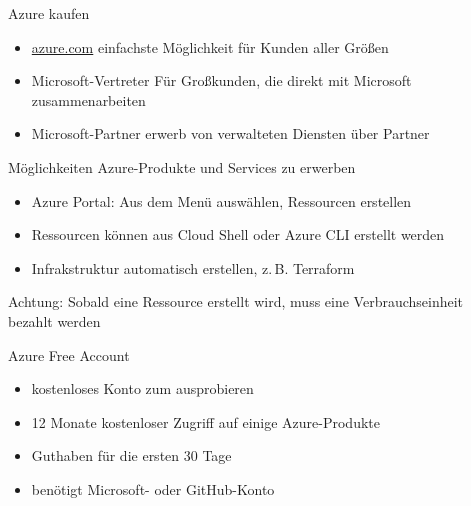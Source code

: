 
\begin{flashcard}[\ ]{Azure kaufen}
    \begin{itemize}
        \item \href{azure.com}{azure.com}\newline
        einfachste Möglichkeit für Kunden aller Größen
        \item Microsoft-Vertreter\newline
        Für Großkunden, die direkt mit Microsoft zusammenarbeiten
        \item Microsoft-Partner\newline
        erwerb von verwalteten Diensten über Partner
    \end{itemize}
\end{flashcard}

\begin{flashcard}[\ ]{Möglichkeiten Azure-Produkte und Services zu erwerben}
    \begin{itemize}
        \item Azure Portal: Aus dem Menü auswählen, Ressourcen erstellen
        \item Ressourcen können aus Cloud Shell oder Azure CLI erstellt werden
        \item Infrakstruktur automatisch erstellen, z.\,B. Terraform
    \end{itemize}

    \vspace{5mm}
    Achtung: Sobald eine Ressource erstellt wird, muss eine Verbrauchseinheit bezahlt werden
\end{flashcard}

\begin{flashcard}[\ ]{Azure Free Account}
    \begin{itemize}
        \item kostenloses Konto zum ausprobieren
        \item 12 Monate kostenloser Zugriff auf einige Azure-Produkte
        \item Guthaben für die ersten 30 Tage
        \item benötigt Microsoft- oder GitHub-Konto
    \end{itemize}

\end{flashcard}

